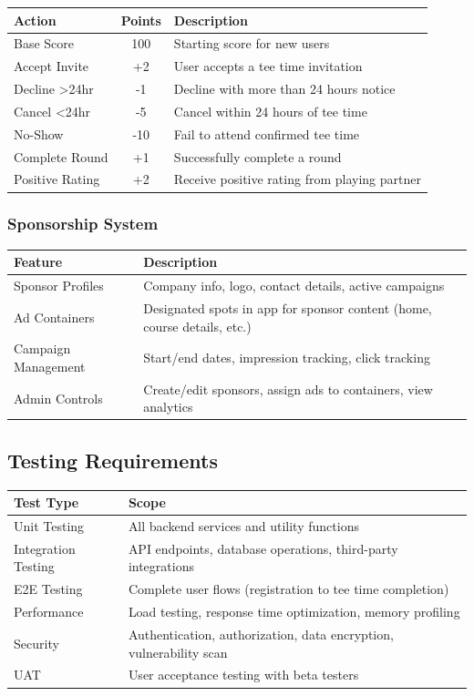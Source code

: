 \documentclass[11pt,a4paper]{article}
\begin{document}
\begin{tabularx}{\textwidth}{|p{4cm}|c|Y|}
\hline
{}
\textbf{Action} & \textbf{Points} & \textbf{Description} \\
\hline
Base Score & 100 & Starting score for new users \\
\hline
Accept Invite & +2 & User accepts a tee time invitation \\
\hline
Decline >24hr & -1 & Decline with more than 24 hours notice \\
\hline
Cancel <24hr & -5 & Cancel within 24 hours of tee time \\
\hline
No-Show & -10 & Fail to attend confirmed tee time \\
\hline
Complete Round & +1 & Successfully complete a round \\
\hline
Positive Rating & +2 & Receive positive rating from playing partner \\
\hline
\end{tabularx}

\subsubsection{Sponsorship System}

\begin{tabularx}{\textwidth}{|p{3cm}|Y|}
\hline
{}
\textbf{Feature} & \textbf{Description} \\
\hline
Sponsor Profiles & Company info, logo, contact details, active campaigns \\
\hline
Ad Containers & Designated spots in app for sponsor content (home, course details, etc.) \\
\hline
Campaign Management & Start/end dates, impression tracking, click tracking \\
\hline
Admin Controls & Create/edit sponsors, assign ads to containers, view analytics \\
\hline
\end{tabularx}


\subsection{Testing Requirements}

\begin{tabularx}{\textwidth}{|p{3cm}|Y|}
\hline
{}
\textbf{Test Type} & \textbf{Scope} \\
\hline
Unit Testing & All backend services and utility functions \\
\hline
Integration Testing & API endpoints, database operations, third-party integrations \\
\hline
E2E Testing & Complete user flows (registration to tee time completion) \\
\hline
Performance & Load testing, response time optimization, memory profiling \\
\hline
Security & Authentication, authorization, data encryption, vulnerability scan \\
\hline
UAT & User acceptance testing with beta testers \\
\hline
\end{tabularx}
\end{document}
